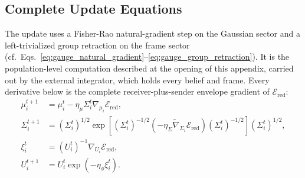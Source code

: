 \subsection*{Complete Update Equations}

The update uses a Fisher-Rao natural-gradient step on the Gaussian sector and a left-trivialized group retraction on the frame sector (cf.\ Eqs.~\eqref{eq:gauge_natural_gradient}--\eqref{eq:gauge_group_retraction}). It is the population-level computation described at the opening of this appendix, carried out by the external integrator, which holds every belief and frame. Every derivative below is the complete receiver-plus-sender envelope gradient of $\mathcal{E}_{\mathrm{red}}$:
\begin{align}
\mu_i^{t+1} &= \mu_i^t - \eta_\mu \Sigma_i^t \nabla_{\mu_i} \mathcal{E}_{\mathrm{red}}, \\
\Sigma_i^{t+1} &= \left(\Sigma_i^t\right)^{1/2} \exp\left[\left(\Sigma_i^t\right)^{-1/2}\left(-\eta_\Sigma \tilde{\nabla}_{\Sigma_i} \mathcal{E}_{\mathrm{red}}\right)\left(\Sigma_i^t\right)^{-1/2}\right] \left(\Sigma_i^t\right)^{1/2}, \\
\xi_i^t &= \left(U_i^t\right)^{-1}\nabla_{U_i} \mathcal{E}_{\mathrm{red}}, \\
U_i^{t+1} &= U_i^t \exp\left(-\eta_\phi \xi_i^t\right).
\end{align}
